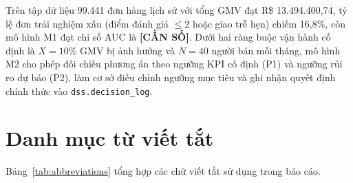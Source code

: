 \documentclass[a4paper]{article}
\begin{document}
Trên tập dữ liệu 99.441 đơn hàng lịch sử với tổng GMV đạt R\$ 13.494.400,74, tỷ lệ đơn trải nghiệm xấu (điểm đánh giá $\le 2$ hoặc giao trễ hẹn) chiếm 16,8\%, còn mô hình M1 đạt chỉ số AUC là \textbf{[CẦN SỐ]}. Dưới hai ràng buộc vận hành cố định là $X = 10\%$ GMV bị ảnh hưởng và $N = 40$ người bán mỗi tháng, mô hình M2 cho phép đối chiếu phương án theo ngưỡng KPI cố định (P1) và ngưỡng rủi ro dự báo (P2), làm cơ sở điều chỉnh ngưỡng mục tiêu và ghi nhận quyết định chính thức vào \texttt{dss.decision\_log}.

\newpage
{}
{}
\section*{Danh mục từ viết tắt}
\nopagebreak[4]
Bảng~\ref{tab:abbreviations} tổng hợp các chữ viết tắt sử dụng trong báo cáo.\par
\nopagebreak[4]
\end{document}
